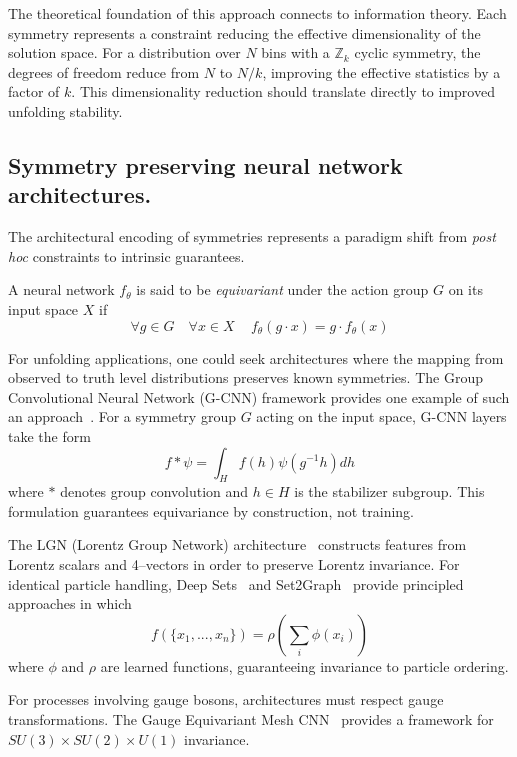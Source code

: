     The theoretical foundation of this approach connects to information theory.
    Each symmetry represents a constraint reducing the effective dimensionality of the solution space.
    For a distribution over \(N\) bins with a \(\mathbb{Z}_k\) cyclic symmetry, the degrees of freedom reduce from \(N\) to \(N/k\), improving the effective statistics by a factor of \(k\).
    This dimensionality reduction should translate directly to improved unfolding stability.

    \subsection{Symmetry preserving neural network architectures.}
        The architectural encoding of symmetries represents a paradigm shift from \textit{post hoc} constraints to intrinsic guarantees.
        \begin{definition}
        A neural network \(f_\theta\) is said to be \textit{equivariant} under the action group \(G\) on its input space \(X\) if
        \[
            \forall g\in G\quad\forall x\in X\quad\,f_\theta(g \cdot x) = g \cdot f_\theta(x)
        \]
        \end{definition}
        For unfolding applications, one could seek architectures where the mapping from observed to truth level distributions preserves known symmetries.
        The Group Convolutional Neural Network (G-CNN) framework provides one example of such an approach~\cite{Cohen:2016wkb}.
        For a symmetry group \(G\) acting on the input space, G-CNN layers take the form
        \[
            f * \psi = \int_H f(h)\psi(g^{-1}h) dh
        \]
        where \(*\) denotes group convolution and \(h\in H\) is the stabilizer subgroup.
        This formulation guarantees equivariance by construction, not training.

        The LGN (Lorentz Group Network) architecture~\cite{Bogatskiy:2020tje} constructs features from Lorentz scalars and 4--vectors in order to preserve Lorentz invariance.
        For identical particle handling, Deep Sets~\cite{Zaheer:2017wmg} and Set2Graph~\cite{Serviansky:2020qwa} provide principled approaches in which
        \[
            f(\{x_1, ..., x_n\}) = \rho\left(\sum_i \phi(x_i)\right)
        \]
        where \(\phi\) and \(\rho\) are learned functions, guaranteeing invariance to particle ordering.
        
        For processes involving gauge bosons, architectures must respect gauge transformations.
        The Gauge Equivariant Mesh CNN~\cite{haan_gauge_2021} provides a framework for \(SU(3) \times SU(2) \times U(1)\) invariance.

